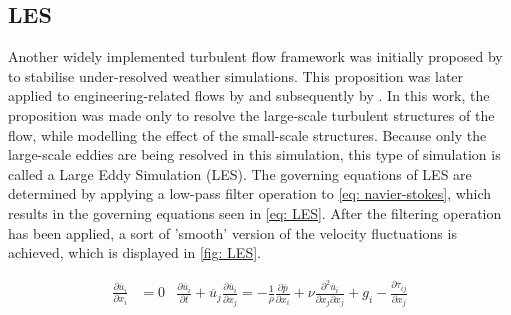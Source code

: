 \subsection{LES}
Another widely implemented turbulent flow framework was initially proposed by \textcite{Smagorinsky1963} to stabilise under-resolved weather simulations. This proposition was later applied to engineering-related flows by \cite{Deardoff1970} and subsequently by \textcite{Schumann1975}. In this work, the proposition was made only to resolve the large-scale turbulent structures of the flow, while modelling the effect of the small-scale structures. Because only the large-scale eddies are being resolved in this simulation, this type of simulation is called a Large Eddy Simulation (LES). The governing equations of LES are determined by applying a low-pass filter operation to \autoref{eq: navier-stokes}, which results in the governing equations seen in \autoref{eq: LES}. After the filtering operation has been applied, a sort of 'smooth' version of the velocity fluctuations is achieved, which is displayed in \autoref{fig: LES}. 


\begin{subequations} \label{eq: LES}
    \begin{equation} \label{eq: LESCont}
    \begin{aligned}
    \frac{\partial  \overline{u}_i }{\partial x_i} &= 0
    \end{aligned}
    \end{equation}

    \begin{equation} \label{eq: LESMomentum}
    \begin{aligned}
   \frac{\partial \overline{u}_i}{\partial t} + \overline{u}_j \frac{\partial \overline{u}_i}{\partial x_j} = 
-\frac{1}{\rho} \frac{\partial \overline{p}}{\partial x_i} 
+ \nu \frac{\partial^2 \overline{u}_i}{\partial x_j \partial x_j} 
+ g_i 
- \frac{\partial \tau_{ij}}{\partial x_j}
    \end{aligned}
    \end{equation}
\end{subequations}



